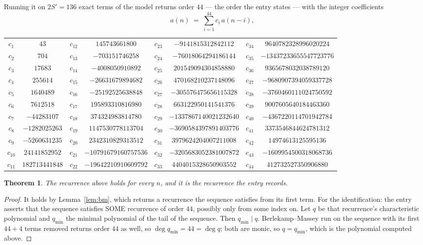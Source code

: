 \documentclass[11pt,a4paper]{article}
\theoremstyle{plain}
\newtheorem{theorem}{Theorem}
\theoremstyle{definition}
\begin{document}
Running it on $2S'=136$ exact terms of the model returns order $44$ --- the order the
entry states --- with the integer coefficients
\[
a(n)\;=\;\sum_{i=1}^{44}c_i\,a(n-i),
\]
\begin{center}\small
\begin{tabular}{cccccccc}
$c_{1}$ & $43$ & $c_{12}$ & $145743661800$ & $c_{23}$ & $-9141815312842112$ & $c_{34}$ & $9640782328996020224$ \\
$c_{2}$ & $704$ & $c_{13}$ & $-703151746258$ & $c_{24}$ & $-76018064294186144$ & $c_{35}$ & $-13437233655547723776$ \\
$c_{3}$ & $17683$ & $c_{14}$ & $-4008050910892$ & $c_{25}$ & $201549094304858880$ & $c_{36}$ & $9365678032038789120$ \\
$c_{4}$ & $255614$ & $c_{15}$ & $-26631679894682$ & $c_{26}$ & $470168210237148096$ & $c_{37}$ & $-9680907394059337728$ \\
$c_{5}$ & $1640489$ & $c_{16}$ & $-25192525638848$ & $c_{27}$ & $-305576475656115328$ & $c_{38}$ & $-3760460111024750592$ \\
$c_{6}$ & $7612518$ & $c_{17}$ & $195893310816980$ & $c_{28}$ & $663122950141541376$ & $c_{39}$ & $9007605640184463360$ \\
$c_{7}$ & $-44283107$ & $c_{18}$ & $374324983814780$ & $c_{29}$ & $-1337867140021232640$ & $c_{40}$ & $-4367220114701942784$ \\
$c_{8}$ & $-1282025263$ & $c_{19}$ & $1147530778113704$ & $c_{30}$ & $-3690584397891403776$ & $c_{41}$ & $3373546844624781312$ \\
$c_{9}$ & $-5260631235$ & $c_{20}$ & $2342310829313512$ & $c_{31}$ & $3979624204007211008$ & $c_{42}$ & $14974613125595136$ \\
$c_{10}$ & $24141852952$ & $c_{21}$ & $-10791679160757536$ & $c_{32}$ & $-3205683052381007872$ & $c_{43}$ & $-1609954500318068736$ \\
$c_{11}$ & $182713441848$ & $c_{22}$ & $-19642210910609792$ & $c_{33}$ & $4404015328650903552$ & $c_{44}$ & $412732527350906880$ \\
\end{tabular}
\end{center}

\begin{theorem}
The recurrence above holds for every $n$, and it is the recurrence the entry records.
\end{theorem}

\begin{proof}
It holds by Lemma~\ref{lem:bm}, which returns a recurrence the sequence satisfies from its
first term. For the identification: the entry asserts that the sequence satisfies SOME
recurrence of order $44$, possibly only from some index on. Let $q$ be that recurrence's
characteristic polynomial and $q_{\min}$ the minimal polynomial of the tail of the sequence.
Then $q_{\min}\mid q$. Berlekamp--Massey run on the sequence with its first $44+4$ terms
removed returns order $44$ as well, so $\deg q_{\min}=44=\deg q$; both are monic, so
$q=q_{\min}$, which is the polynomial computed above.
\end{proof}
\end{document}
